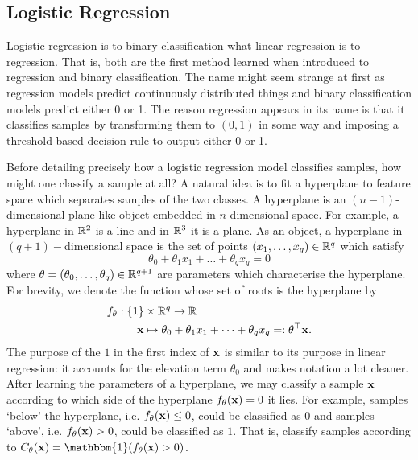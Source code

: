\documentclass[11pt]{article}
\begin{document}
\subsection{Logistic Regression}

Logistic regression is to binary classification what linear regression is to regression. That is, both are the first method learned when introduced to regression and binary classification. The name might seem strange at first as regression models predict continuously distributed things and binary classification models predict either 0 or 1. The reason regression appears in its name is that it classifies samples by transforming them to $(0,1)$ in some way and imposing a threshold-based decision rule to output either 0 or 1.

Before detailing precisely how a logistic regression model classifies samples, how might one classify a sample at all? A natural idea is to fit a hyperplane to feature space which separates samples of the two classes. A hyperplane is an $(n-1)$-dimensional plane-like object embedded in $n$-dimensional space. For example, a hyperplane in $\mathbb{R}^2$ is a line and in $\mathbb{R}^3$ it is a plane. As an object, a hyperplane in $(q+1)-$dimensional space is the set of points $(x_1,\dots,x_q)\in\mathbb{R}^q$ which satisfy %
$$
\theta_0+\theta_1x_1+\dots+\theta_qx_q
=
0
$$
where $\theta=(\theta_0,\dots,\theta_q)\in\mathbb{R}^{q+1}$ are parameters which characterise the hyperplane. For brevity, we denote the function whose set of roots is the hyperplane by
\begin{align*}
    f_{\theta}:\{1\}&\times\mathbb{R}^q\to\mathbb{R}\\
    \mathbf{x}&\mapsto \theta_0+\theta_1x_1+\dots+\theta_qx_q=:\theta^\top \mathbf{x}.
\end{align*}
The purpose of the $1$ in the first index of $\mathbf{x}$ is similar to its purpose in linear regression: it accounts for the elevation term $\theta_0$ and makes notation a lot cleaner. After learning the parameters of a hyperplane, we may classify a sample $\mathbf{x}$ according to which side of the hyperplane $f_{\theta}(\mathbf{x})=0$ it lies. For example, samples `below' the hyperplane, i.e. $f_{\theta}(\mathbf{x})\leq0$, could be classified as $0$ and samples `above', i.e. $f_{\theta}(\mathbf{x})>0$, could be classified as $1$. That is, classify samples according to $C_{\theta}(\x)=\mathbbm{1}(f_{\theta}(\x)>0)$.
\end{document}
